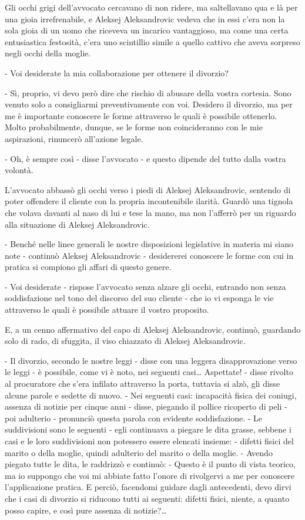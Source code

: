 Gli occhi grigi dell'avvocato cercavano di non ridere, ma saltellavano qua e là per una gioia irrefrenabile, e Aleksej Aleksandrovic vedeva che in essi c'era non la sola gioia di un uomo che riceveva un incarico vantaggioso, ma come una certa entusiastica festosità, c'era uno scintillio simile a quello cattivo che aveva sorpreso negli occhi della moglie. 

- Voi desiderate la mia collaborazione per ottenere il divorzio? 

- Sì, proprio, vi devo però dire che rischio di abusare della vostra cortesia. Sono venuto solo a consigliarmi preventivamente con voi. Desidero il divorzio, ma per me è importante conoscere le forme attraverso le quali è possibile ottenerlo. Molto probabilmente, dunque, se le forme non coincideranno con le mie aspirazioni, rinuncerò all'azione legale. 

- Oh, è sempre così - disse l'avvocato - e questo dipende del tutto dalla vostra volontà. 

L'avvocato abbassò gli occhi verso i piedi di Aleksej Aleksandrovic, sentendo di poter offendere il cliente con la propria incontenibile ilarità. Guardò una tignola che volava davanti al naso di lui e tese la mano, ma non l'afferrò per un riguardo alla situazione di Aleksej Aleksandrovic. 

- Benché nelle linee generali le nostre disposizioni legislative in materia mi siano note - continuò Aleksej Aleksandrovic - desidererei conoscere le forme con cui in pratica si compiono gli affari di questo genere. 

- Voi desiderate - rispose l'avvocato senza alzare gli occhi, entrando non senza soddisfazione nel tono del discorso del suo cliente - che io vi esponga le vie attraverso le quali è possibile attuare il vostro proposito. 

E, a un cenno affermativo del capo di Aleksej Aleksandrovic, continuò, guardando solo di rado, di sfuggita, il viso chiazzato di Aleksej Aleksandrovic. 

- Il divorzio, secondo le nostre leggi - disse con una leggera disapprovazione verso le leggi - è possibile, come vi è noto, nei seguenti casi\ldots{} Aspettate! - disse rivolto al procuratore che s'era infilato attraverso la porta, tuttavia si alzò, gli disse alcune parole e sedette di nuovo. - Nei seguenti casi: incapacità fisica dei coniugi, assenza di notizie per cinque anni - disse, piegando il pollice ricoperto di peli - poi adulterio - pronunciò questa parola con evidente soddisfazione. - Le suddivisioni sono le seguenti - egli continuava a piegare le dita grasse, sebbene i casi e le loro suddivisioni non potessero essere elencati insieme: - difetti fisici del marito o della moglie, quindi adulterio del marito o della moglie. - Avendo piegato tutte le dita, le raddrizzò e continuò: - Questo è il punto di vista teorico, ma io suppongo che voi mi abbiate fatto l'onore di rivolgervi a me per conoscere l'applicazione pratica. E perciò, facendomi guidare dagli antecedenti, devo dirvi che i casi di divorzio si riducono tutti ai seguenti: difetti fisici, niente, a quanto posso capire, e così pure assenza di notizie?\ldots{} 

